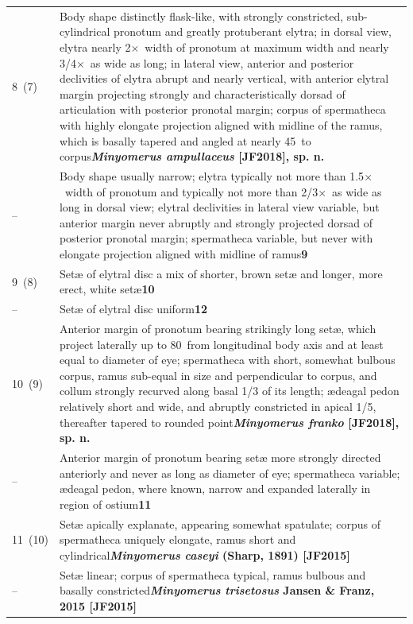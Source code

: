 \documentclass[fleqn,10pt,lineno]{wlpeerj} %
\newcommand{\td}{\textdegree~}
\newcommand{\x}{$\times$~}
\newcommand{\breakfill}{\dotfill\newline\penalty0\hbox{}\nobreak\dotfill}
\begin{document}
\begin{xtabular}{@{}
                p{\dimexpr.1\textwidth-\tabcolsep\relax}
                p{\dimexpr.9\textwidth-\tabcolsep\relax}@{}}
		{8~(7)} & {Body shape distinctly flask-like, with strongly constricted, sub-cylindrical pronotum and greatly protuberant elytra; in dorsal view, elytra nearly 2\x width of pronotum at maximum width and nearly 3/4\x as wide as long; in lateral view, anterior and posterior declivities of elytra abrupt and nearly vertical, with anterior elytral margin projecting strongly and characteristically dorsad of articulation with posterior pronotal margin; corpus of spermatheca with highly elongate projection aligned with midline of the ramus, which is basally tapered and angled at nearly 45\td to corpus}{\dotfill}{\textbf{\textit{Minyomerus ampullaceus} [JF2018], sp. n.}}\\
		{--} & {Body shape usually narrow; elytra typically not more than 1.5\x width of pronotum and typically not more than 2/3\x as wide as long in dorsal view; elytral declivities in lateral view variable, but anterior margin never abruptly and strongly projected dorsad of posterior pronotal margin; spermatheca variable, but never with elongate projection aligned with midline of ramus}{\dotfill}{\textbf{9}}\\
		
		{9~(8)} & {Set{\ae} of elytral disc a mix of shorter, brown set{\ae} and longer, more erect, white set{\ae}}{\dotfill}{\textbf{10}}\\
		{--} & {Set{\ae} of elytral disc uniform}{\dotfill}{\textbf{12}}\\
		
		{10~(9)} & {Anterior margin of pronotum bearing strikingly long set{\ae}, which project laterally up to 80\td from longitudinal body axis and at least equal to diameter of eye;	spermatheca with short, somewhat bulbous corpus, ramus sub-equal in size and perpendicular to corpus, and collum strongly recurved along basal 1/3 of its length; {\ae}deagal pedon relatively short and wide, and abruptly constricted in apical 1/5, thereafter tapered to rounded point}{\breakfill}{\textbf{\textit{Minyomerus franko} [JF2018], sp. n.}}\\
		{--} & {Anterior margin of pronotum bearing set{\ae} more strongly directed anteriorly and never as long as diameter of eye; spermatheca variable; {\ae}deagal pedon, where known, narrow and expanded laterally in region of ostium}{\dotfill}{\textbf{11}}\\
		
		{11~(10)} & {Set{\ae} apically explanate, appearing somewhat spatulate; corpus of spermatheca uniquely elongate, ramus short and cylindrical}{\dotfill}{\textbf{\textit{Minyomerus caseyi} (Sharp, 1891) [JF2015]}}\\
		{--} & {Set{\ae} linear; corpus of spermatheca typical, ramus bulbous and basally constricted}{\breakfill}{\textbf{\textit{Minyomerus trisetosus} Jansen \& Franz, 2015 [JF2015]}}\\
		

\end{xtabular}
\end{document}
